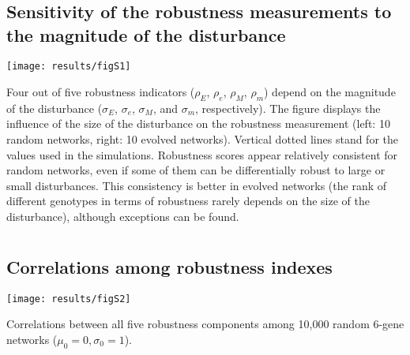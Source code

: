 \documentclass[10pt,a4paper]{article}
\newcommand{\earlyenv}{{\rho_E}}
\newcommand{\lateenv}{{\rho_e}}
\newcommand{\earlymut}{{\rho_M}}
\newcommand{\latemut}{{\rho_m}}
\begin{document}
\begin{appendices}
  \setcounter{section}{0}
  \renewcommand{\thesection}{\arabic{section}}

  \section{}
    \label{supp:sensitmag}
    \subsection*{Sensitivity of the robustness measurements to the magnitude of the disturbance}
	\begin{center}
	\texttt{[image: results/figS1]}
	\end{center}
	{\color{Gray} Four out of five robustness indicators ($\earlyenv$, $\lateenv$, $\earlymut$, $\latemut$) depend on the magnitude of the disturbance ($\sigma_E$, $\sigma_e$, $\sigma_M$, and $\sigma_m$, respectively). The figure displays the influence of the size of the disturbance on the robustness measurement (left: 10 random networks, right: 10 evolved networks). Vertical dotted lines stand for the values used in the simulations. Robustness scores appear relatively consistent for random networks, even if some of them can be differentially robust to large or small disturbances. This consistency is better in evolved networks (the rank of different genotypes in terms of robustness rarely depends on the size of the disturbance), although exceptions can be found.  }


  \clearpage
  \section{}
    \label{supp:fullcorr}
    \subsection*{Correlations among robustness indexes}
	\begin{adjustwidth}{-1in}{0in}
	\begin{flushright}
	\texttt{[image: results/figS2]}
	\end{flushright}

	\color{Gray} Correlations between all five robustness components among 10,000 random 6-gene networks ($\mu_0=0, \sigma_0=1$). 
	\end{adjustwidth}


  \clearpage
  \section{}
    \label{supp:PC}

\end{appendices}
\end{document}
